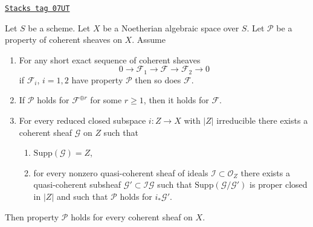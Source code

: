\begin{lemma}
\label{spaces-cohomology-lemma-property-higher-rank-cohomological}
\href{https://stacks.math.columbia.edu/tag/07UT}{\texttt{Stacks tag 07UT}}

Let $S$ be a scheme. Let $X$ be a Noetherian algebraic space over $S$.
Let $\mathcal{P}$ be a property of coherent sheaves on $X$. Assume
\begin{enumerate}
\item For any short exact sequence of coherent sheaves
$$
0 \to \mathcal{F}_1 \to \mathcal{F} \to \mathcal{F}_2 \to 0
$$
if $\mathcal{F}_i$, $i = 1, 2$ have property $\mathcal{P}$
then so does $\mathcal{F}$.
\item If $\mathcal{P}$ holds for $\mathcal{F}^{\oplus r}$ for
some $r \geq 1$, then it holds for $\mathcal{F}$.
\item For every reduced closed subspace $i : Z \to X$ with
$|Z|$ irreducible there exists a coherent sheaf $\mathcal{G}$ on $Z$
such that
\begin{enumerate}
\item $\text{Supp}(\mathcal{G}) = Z$,
\item for every nonzero quasi-coherent sheaf of ideals
$\mathcal{I} \subset \mathcal{O}_Z$ there exists a quasi-coherent
subsheaf $\mathcal{G}' \subset \mathcal{I}\mathcal{G}$ such that
$\text{Supp}(\mathcal{G}/\mathcal{G}')$ is proper closed in $|Z|$
and such that $\mathcal{P}$ holds for $i_*\mathcal{G}'$.
\end{enumerate}
\end{enumerate}
Then property $\mathcal{P}$ holds for every coherent sheaf on $X$.
\end{lemma}

